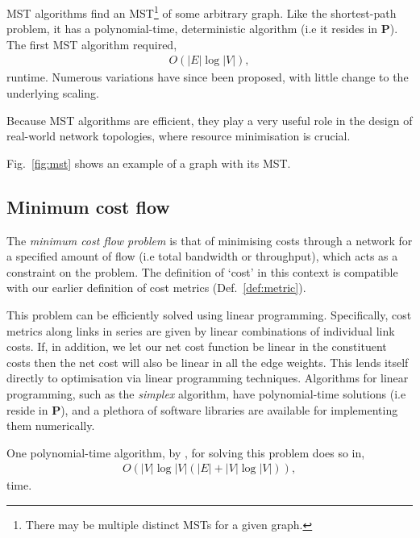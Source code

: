 MST algorithms find an MST\footnote{There may be multiple distinct MSTs for a given graph.} of some arbitrary graph. Like the shortest-path problem, it has a polynomial-time, deterministic algorithm (i.e it resides in \textbf{P}). The first MST algorithm \cite{bib:Boruvka26} required,
\begin{align}
	O(|E|\log |V|),
\end{align}
runtime. Numerous variations have since been proposed, with little change to the underlying scaling.

Because MST algorithms are efficient, they play a very useful role in the design of real-world network topologies, where resource minimisation is crucial.

Fig.~\ref{fig:mst} shows an example of a graph with its MST.

%
%

\subsection{Minimum cost flow} \label{sec:min_cost_flow_prob} 

The \textit{minimum cost flow problem} \cite{???} is that of minimising costs through a network for a specified amount of flow (i.e total bandwidth or throughput), which acts as a constraint on the problem. The definition of `cost' in this context is compatible with our earlier definition of cost metrics (Def.~\ref{def:metric}).

This problem can be efficiently solved using linear programming. Specifically, cost metrics along links in series are given by linear combinations of individual link costs. If, in addition, we let our net cost function be linear in the constituent costs then the net cost will also be linear in all the edge weights. This lends itself directly to optimisation via linear programming techniques. Algorithms for linear programming, such as the \textit{simplex} algorithm, have polynomial-time solutions (i.e reside in \textbf{P}), and a plethora of software libraries are available for implementing them numerically.

One polynomial-time algorithm, by \cite{JAMES_B_ORLIN}, for solving this problem does so in, 
\begin{align}
	O(|V|\log |V|(|E|+|V|\log |V|)),
\end{align}
time.

%
%

